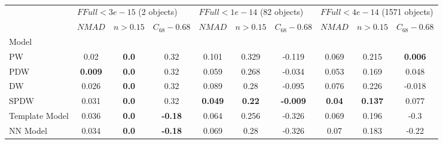 \documentclass[fleqn,usenatbib]{mnras}
\begin{document}
\begin{table}
	\begin{tabular}{lccccccccc}
            \hline
            {} & \multicolumn{3}{l}{$FFull < 3e-15$ (2 objects)} & \multicolumn{3}{l}{$FFull < 1e-14$ (82 objects)} & \multicolumn{3}{l}{$FFull < 4e-14$ (1571 objects)} \\
            {} &                      $NMAD$ &      $n>0.15$ & $C_{68} - 0.68$ &                       $NMAD$ &       $n>0.15$ &  $C_{68} - 0.68$ &                         $NMAD$ &        $n>0.15$ & $C_{68} - 0.68$ \\
            Model          &                             &               &                 &                              &                &                  &                                &                 &                 \\
            \hline
            PW             &                        0.02 &  \textbf{0.0} &            0.32 &                        0.101 &          0.329 &           -0.119 &                          0.069 &           0.215 &  \textbf{0.006} \\
            PDW            &              \textbf{0.009} &  \textbf{0.0} &            0.32 &                        0.059 &          0.268 &           -0.034 &                          0.053 &           0.169 &           0.048 \\
            DW             &                       0.026 &  \textbf{0.0} &            0.32 &                        0.089 &           0.28 &           -0.095 &                          0.076 &           0.226 &          -0.018 \\
            SPDW           &                       0.031 &  \textbf{0.0} &            0.32 &               \textbf{0.049} &  \textbf{0.22} &  \textbf{-0.009} &                  \textbf{0.04} &  \textbf{0.137} &           0.077 \\
            Template Model &                       0.036 &  \textbf{0.0} &  \textbf{-0.18} &                        0.064 &          0.256 &           -0.326 &                          0.069 &           0.196 &            -0.3 \\
            NN Model       &                       0.034 &  \textbf{0.0} &  \textbf{-0.18} &                        0.069 &           0.28 &           -0.326 &                           0.07 &           0.183 &           -0.22 \\
            \hline
            \end{tabular}
            \caption{}
\end{table}
\end{document}

